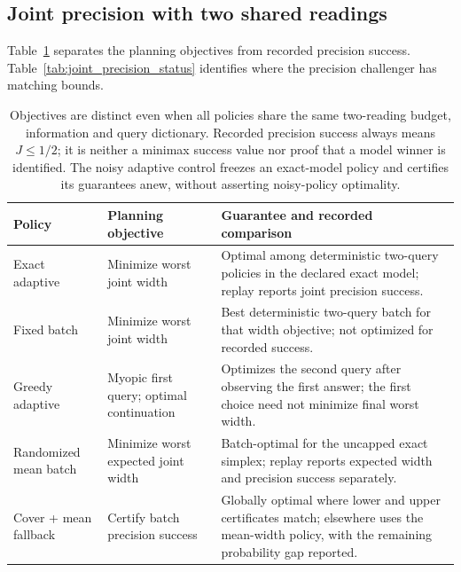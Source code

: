 \documentclass[12pt]{article}
\begin{document}
\subsection{Joint precision with two shared readings}\label{sec:joint-results}
Table~\ref{tab:joint_objectives} separates the planning objectives from
recorded precision success. Table~\ref{tab:joint_precision_status}
identifies where the precision challenger has matching bounds.
\begin{table}[htbp]
\centering\small
\begin{tabular}{>{\raggedright\arraybackslash}p{.19\linewidth}>{\raggedright\arraybackslash}p{.25\linewidth}>{\raggedright\arraybackslash}p{.45\linewidth}}
\toprule
Policy & Planning objective & Guarantee and recorded comparison\\
\midrule
Exact adaptive & Minimize worst joint width & Optimal among deterministic two-query policies in the declared exact model; replay reports joint precision success.\\
Fixed batch & Minimize worst joint width & Best deterministic two-query batch for that width objective; not optimized for recorded success.\\
Greedy adaptive & Myopic first query; optimal continuation & Optimizes the second query after observing the first answer; the first choice need not minimize final worst width.\\
Randomized mean batch & Minimize worst expected joint width & Batch-optimal for the uncapped exact simplex; replay reports expected width and precision success separately.\\
Cover + mean fallback & Certify batch precision success & Globally optimal where lower and upper certificates match; elsewhere uses the mean-width policy, with the remaining probability gap reported.\\
\bottomrule
\end{tabular}
\caption{Objectives are distinct even when all policies share the same two-reading budget, information and query dictionary. Recorded precision success always means $J\leq1/2$; it is neither a minimax success value nor proof that a model winner is identified. The noisy adaptive control freezes an exact-model policy and certifies its guarantees anew, without asserting noisy-policy optimality.}
\label{tab:joint_objectives}
\end{table}
\end{document}
